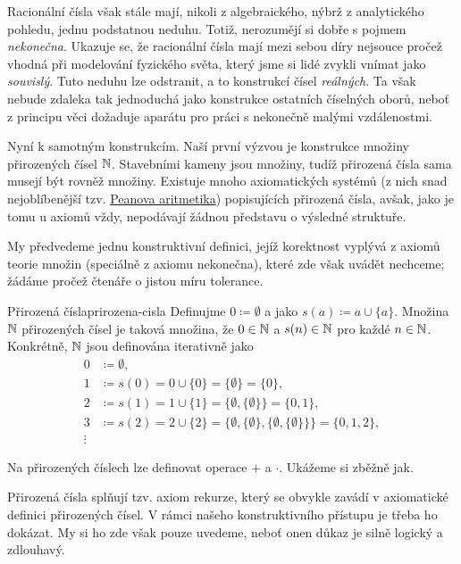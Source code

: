 Racionální čísla však stále mají, nikoli z algebraického, nýbrž z analytického
pohledu, jednu podstatnou neduhu. Totiž, nerozumějí si dobře s pojmem
\emph{nekonečna}. Ukazuje se, že racionální čísla mají mezi sebou  díry nejsouce pročež vhodná při modelování fyzického světa, který jsme si
lidé zvykli vnímat jako \emph{souvislý}. Tuto neduhu lze odstranit, a to
konstrukcí čísel \emph{reálných}. Ta však nebude zdaleka tak jednoduchá jako
konstrukce ostatních číselných oborů, neboť z principu věci dožaduje aparátu pro
práci s nekonečně malými vzdálenostmi.

Nyní k samotným konstrukcím. Naší první výzvou je konstrukce množiny přirozených
čísel $\mathbb{N}$. Stavebními kameny jsou množiny, tudíž přirozená čísla sama musejí
být rovněž množiny. Existuje mnoho axiomatických systémů (z nich snad
nejoblíbenější tzv.
\href{https://cs.wikipedia.org/wiki/Peanova_aritmetika}{Peanova aritmetika})
popisujících přirozená čísla, avšak, jako je tomu u axiomů vždy, nepodávají
žádnou představu o výsledné struktuře.

My předvedeme jednu konstruktivní definici, jejíž korektnost vyplývá z axiomů
teorie množin (speciálně z axiomu nekonečna), které zde však uvádět nechceme;
žádáme pročež čtenáře o jistou míru tolerance.

\begin{definition}{Přirozená čísla}{prirozena-cisla}
 Definujme $0 \coloneqq \emptyset$ a  jako $s(a) \coloneqq
 a \cup \{a\}$. Množina $\mathbb{N}$ přirozených čísel je taková množina, že $0 \in \mathbb{N}$
 a $s(n) \in \mathbb{N}$ pro každé $n \in \mathbb{N}$. Konkrétně, $\mathbb{N}$ jsou definována
 iterativně jako
 \begin{align*}
  0 &\coloneqq \emptyset,\\
  1 & \coloneqq s(0) = 0 \cup \{0\} = \{\emptyset\} = \{0\},\\
  2 & \coloneqq s(1) = 1 \cup \{1\} = \{\emptyset,\{\emptyset\}\} = \{0,1\},\\
  3 & \coloneqq s(2) = 2 \cup \{2\} =
  \{\emptyset,\{\emptyset\},\{\emptyset,\{\emptyset\}\}\} = \{0,1,2\},\\
  \vdots
 \end{align*}
\end{definition}

Na přirozených číslech lze definovat operace $+$ a $ \cdot $. Ukážeme si zběžně
jak.

Přirozená čísla splňují tzv. axiom rekurze, který se obvykle zavádí v
axiomatické definici přirozených čísel. V rámci našeho konstruktivního přístupu
je třeba ho dokázat. My si ho zde však pouze uvedeme, neboť onen důkaz je silně
logický a zdlouhavý.

